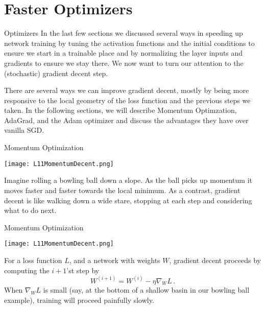 \documentclass[10pt, table, dvipsnames,xcdraw,handout]{beamer}
\begin{document}
\section{Faster Optimizers}



\begin{frame}[fragile]{Optimizers}
In the last few sections we discussed several ways in speeding up network training by tuning the activation functions and the initial conditions to ensure we start in a trainable place and by normalizing the layer inputs and gradients to ensure we stay there. We now want to turn our attention to the (stochastic) gradient decent step. 

There are several ways we can improve gradient decent, mostly by being more responsive to the local geometry of the loss function and the previous steps we taken. In the following sections, we will describe Momentum Optimzation, AdaGrad, and the Adam optimizer and discuss the advantages they have over vanilla SGD.
\end{frame}




\begin{frame}[fragile]{Momentum Optimization}
  \begin{minipage}[t][0.5\textheight][t]{\textwidth}
	\centering \texttt{[image: L11MomentumDecent.png]} 
  \end{minipage}
  \vfill
\begin{minipage}[t][0.5\textheight][t]{\textwidth}
Imagine rolling a bowling ball down a slope. As the ball picks up momentum it moves faster and faster towards the local minimum. As a contrast, gradient decent is like walking down a wide stare, stopping at each step and considering what to do next. 
\end{minipage}
\end{frame}



\begin{frame}[fragile]{Momentum Optimization}
  \begin{minipage}[t][0.5\textheight][t]{\textwidth}
	\centering \texttt{[image: L11MomentumDecent.png]} 
  \end{minipage}
  \vfill
\begin{minipage}[t][0.5\textheight][t]{\textwidth}
For a loss function $L$, and a network with weights $W$, gradient decent proceeds by computing the $i+1$'st step by
$$
W^{(i+1)} = W^{(i)} - \eta \nabla_W L\,.
$$
When $\nabla_W L$ is small (say, at the bottom of a shallow basin in our bowling ball example), training will proceed painfully slowly. 
\end{minipage}
\end{frame}
\end{document}
